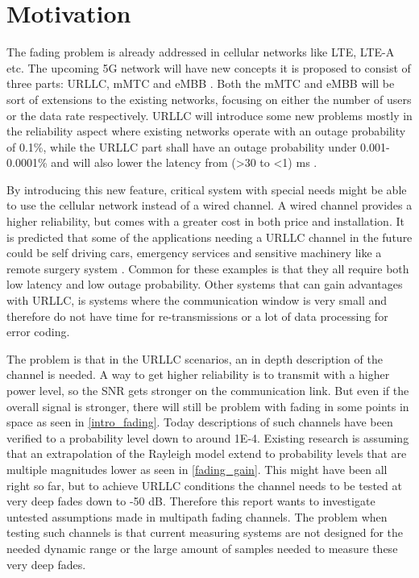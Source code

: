 \newpage
\section{Motivation}

The fading problem is already addressed in cellular networks like \gls{LTE}, \gls{LTE-A} etc. The upcoming 5G network will have new concepts it is proposed to consist of three parts: \Gls{URLLC}, \gls{mMTC} and \gls{eMBB} \citep{5G}. Both the \gls{mMTC} and \gls{eMBB} will be sort of extensions to the existing networks, focusing on either the number of users or the data rate respectively. \Gls{URLLC} will introduce some new problems mostly in the reliability aspect where existing networks operate with an outage probability of 0.1\%, while the URLLC part shall have an outage probability under 0.001-0.0001\% \citep{LTE,Petar5G} and will also lower the latency from (>30 to <1) ms \citep{LTE,5G_Latency}. 

By introducing this new feature, critical system with special needs might be able to use the cellular network instead of a wired channel. A wired channel provides a higher reliability, but comes with a greater cost in both price and installation. It is predicted that some of the applications needing a URLLC channel in the future could be self driving cars, emergency services and sensitive machinery like a remote surgery system \citep{Petar5G}. Common for these examples is that they all require both low latency and low outage probability. Other systems that can gain advantages with URLLC, is systems where the communication window is very small and therefore do not have time for re-transmissions or a lot of data processing for error coding.


The problem is that in the URLLC scenarios, an in depth description of the channel is needed. A way to get higher reliability is to transmit with a higher power level, so the \gls{SNR} gets stronger on the communication link. But even if the overall signal is stronger, there will still be problem with fading in some points in space as seen in \autoref{intro_fading}. Today descriptions of such channels have been verified to a probability level down to around 1E-4. Existing research is assuming that an extrapolation of the Rayleigh model extend to probability levels that are multiple magnitudes lower as seen in \autoref{fading_gain}. This might have been all right so far, but to achieve URLLC conditions the channel needs to be tested at very deep fades down to -50 dB. Therefore this report wants to investigate untested assumptions made in multipath fading channels. The problem when testing such channels is that current measuring systems are not designed for the needed dynamic range or the large amount of samples needed to measure these very deep fades. 

